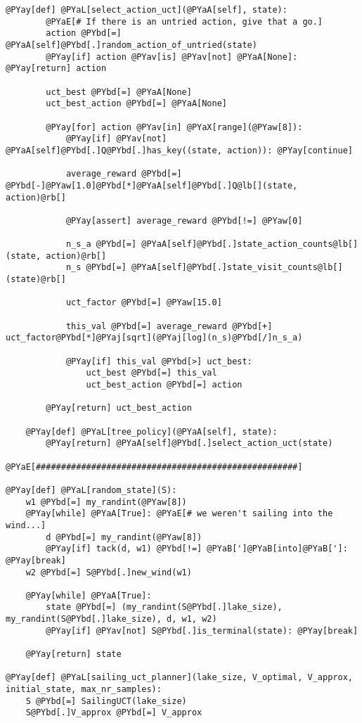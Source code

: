 \begin{Verbatim}[commandchars=@\[\]]
    @PYay[def] @PYaL[select_action_uct](@PYaA[self], state):
        @PYaE[# If there is an untried action, give that a go.]
        action @PYbd[=] @PYaA[self]@PYbd[.]random_action_of_untried(state)
        @PYay[if] action @PYav[is] @PYav[not] @PYaA[None]: @PYay[return] action

        uct_best @PYbd[=] @PYaA[None]
        uct_best_action @PYbd[=] @PYaA[None]

        @PYay[for] action @PYav[in] @PYaX[range](@PYaw[8]):
            @PYay[if] @PYav[not] @PYaA[self]@PYbd[.]Q@PYbd[.]has_key((state, action)): @PYay[continue]

            average_reward @PYbd[=] @PYbd[-]@PYaw[1.0]@PYbd[*]@PYaA[self]@PYbd[.]Q@lb[](state, action)@rb[]

            @PYay[assert] average_reward @PYbd[!=] @PYaw[0]

            n_s_a @PYbd[=] @PYaA[self]@PYbd[.]state_action_counts@lb[](state, action)@rb[]
            n_s @PYbd[=] @PYaA[self]@PYbd[.]state_visit_counts@lb[](state)@rb[]

            uct_factor @PYbd[=] @PYaw[15.0]

            this_val @PYbd[=] average_reward @PYbd[+] uct_factor@PYbd[*]@PYaj[sqrt](@PYaj[log](n_s)@PYbd[/]n_s_a)

            @PYay[if] this_val @PYbd[>] uct_best:
                uct_best @PYbd[=] this_val
                uct_best_action @PYbd[=] action

        @PYay[return] uct_best_action

    @PYay[def] @PYaL[tree_policy](@PYaA[self], state):
        @PYay[return] @PYaA[self]@PYbd[.]select_action_uct(state)
 
@PYaE[####################################################]

@PYay[def] @PYaL[random_state](S):
    w1 @PYbd[=] my_randint(@PYaw[8])
    @PYay[while] @PYaA[True]: @PYaE[# we weren't sailing into the wind...]
        d @PYbd[=] my_randint(@PYaw[8])
        @PYay[if] tack(d, w1) @PYbd[!=] @PYaB[']@PYaB[into]@PYaB[']: @PYay[break]
    w2 @PYbd[=] S@PYbd[.]new_wind(w1)

    @PYay[while] @PYaA[True]:
        state @PYbd[=] (my_randint(S@PYbd[.]lake_size), my_randint(S@PYbd[.]lake_size), d, w1, w2)
        @PYay[if] @PYav[not] S@PYbd[.]is_terminal(state): @PYay[break]

    @PYay[return] state

@PYay[def] @PYaL[sailing_uct_planner](lake_size, V_optimal, V_approx, initial_state, max_nr_samples):
    S @PYbd[=] SailingUCT(lake_size)
    S@PYbd[.]V_approx @PYbd[=] V_approx


\end{Verbatim}
